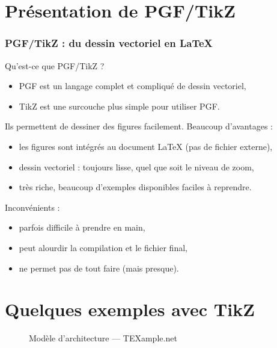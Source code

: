 
\section{Présentation de PGF/TikZ}

\begin{frame}
  \frametitle{PGF/TikZ : du dessin vectoriel en \LaTeX}

Qu'est-ce que PGF/TikZ ?
\begin{itemize}
  \item PGF est un langage complet et compliqué de dessin vectoriel,
  \item TikZ est une surcouche plus simple pour utiliser PGF.
\end{itemize}

\bigskip
Ils permettent de dessiner des figures facilement. Beaucoup d'avantages :
\begin{itemize}
  \item les figures sont intégrés au document \LaTeX{} (pas de fichier externe),
  \item dessin vectoriel : toujours lisse, quel que soit le niveau de zoom,
  \item très riche, beaucoup d'exemples disponibles faciles à reprendre.
\end{itemize}

\bigskip
Inconvénients :
\begin{itemize}
  \item parfois difficile à prendre en main,
  \item peut alourdir la compilation et le fichier final,
  \item ne permet pas de tout faire (mais presque).
\end{itemize}
\end{frame}



\section{Quelques exemples avec TikZ}



\begin{frame}
  \begin{figure}
    \centering
    \tikzexa
    \caption{\footnotesize Modèle d'architecture --- TEXample.net \cite{tikzandpgfexamples}}
  \end{figure}
\end{frame}

